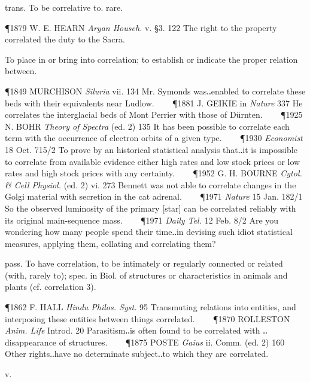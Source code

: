 \begin{description}[wide, labelwidth=!, labelindent=0pt]
\begin{myenumerate}
 trans. To be correlative to. rare.

\P 1879 W. E. HEARN  \textit{Aryan Househ.} v. §3. 122 The right to the property correlated the duty to the Sacra.

 To place in or bring into correlation; to establish or indicate the proper relation between.

\P 1849 MURCHISON  \textit{Siluria} vii. 134 Mr. Symonds was‥enabled to correlate these beds with their equivalents near Ludlow.    
\P 1881 J. GEIKIE in  \textit{Nature} 337 He correlates the interglacial beds of Mont Perrier with those of Dürnten.    
\P 1925 N. BOHR  \textit{Theory of Spectra} (ed. 2) 135 It has been possible to correlate each term with the occurrence of electron orbits of a given type.    
\P 1930  \textit{Economist} 18 Oct. 715/2 To prove by an historical statistical analysis that‥it is impossible to correlate from available evidence either high rates and low stock prices or low rates and high stock prices with any certainty.    
\P 1952 G. H. BOURNE  \textit{Cytol. \& Cell Physiol.} (ed. 2) vi. 273 Bennett was not able to correlate changes in the Golgi material with secretion in the cat adrenal.    
\P 1971  \textit{Nature} 15 Jan. 182/1 So the observed luminosity of the primary [star] can be correlated reliably with its original main-sequence mass.    
\P 1971  \textit{Daily Tel.} 12 Feb. 8/2 Are you wondering how many people spend their time‥in devising such idiot statistical measures, applying them, collating and correlating them?

 pass. To have correlation, to be intimately or regularly connected or related (with, rarely to); spec. in Biol. of structures or characteristics in animals and plants (cf. correlation 3).

\P 1862 F. HALL  \textit{Hindu Philos. Syst.} 95 Transmuting relations into entities, and interposing these entities between things correlated.    
\P 1870 ROLLESTON  \textit{Anim. Life} Introd. 20 Parasitism‥is often found to be correlated with ‥ disappearance of structures.    
\P 1875 POSTE  \textit{Gaius} ii. Comm. (ed. 2) 160 Other rights‥have no determinate subject‥to which they are correlated.
\end{myenumerate}


 v.

\noindent {}

\vspace{-0.3cm}


\end{description}
